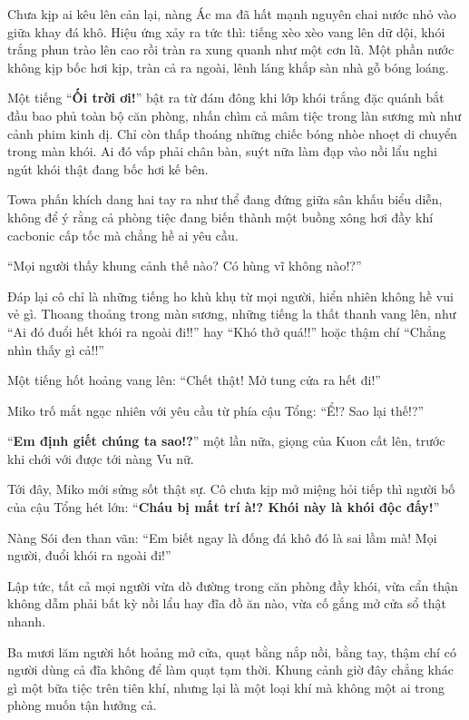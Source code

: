 \documentclass[../main.tex]{subfiles}
\begin{document}
Chưa kịp ai kêu lên cản lại, nàng Ác ma đã hất mạnh nguyên chai nước nhỏ vào giữa khay đá khô. Hiệu ứng xảy ra tức thì: tiếng xèo xèo vang lên dữ dội, khói trắng phun trào lên cao rồi tràn ra xung quanh như một cơn lũ. Một phần nước không kịp bốc hơi kịp, tràn cả ra ngoài, lênh láng khắp sàn nhà gỗ bóng loáng.

Một tiếng ``\textbf{Ối trời ơi!}'' bật ra từ đám đông khi lớp khói trắng đặc quánh bắt đầu bao phủ toàn bộ căn phòng, nhấn chìm cả mâm tiệc trong làn sương mù như cảnh phim kinh dị. Chỉ còn thấp thoáng những chiếc bóng nhòe nhoẹt di chuyển trong màn khói. Ai đó vấp phải chân bàn, suýt nữa làm đạp vào nồi lẩu nghi ngút khói thật đang bốc hơi kế bên.

Towa phấn khích dang hai tay ra như thể đang đứng giữa sân khấu biểu diễn, không để ý rằng cả phòng tiệc đang biến thành một buồng xông hơi đầy khí cacbonic cấp tốc mà chẳng hề ai yêu cầu.

``Mọi người thấy khung cảnh thế nào? Có hùng vĩ không nào!?''

Đáp lại cô chỉ là những tiếng ho khù khụ từ mọi người, hiển nhiên không hề vui vẻ gì. Thoang thoảng trong màn sương, những tiếng la thất thanh vang lên, như ``Ai đó đuổi hết khói ra ngoài đi!!'' hay ``Khó thở quá!!'' hoặc thậm chí ``Chẳng nhìn thấy gì cả!!''

Một tiếng hốt hoảng vang lên: ``Chết thật! Mở tung cửa ra hết đi!''

Miko trố mắt ngạc nhiên với yêu cầu từ phía cậu Tổng: ``Ể!? Sao lại thế!?''

``\textbf{Em định giết chúng ta sao!?}'' một lần nữa, giọng của Kuon cất lên, trước khi chới với được tới nàng Vu nữ.

Tới đây, Miko mới sửng sốt thật sự. Cô chưa kịp mở miệng hỏi tiếp thì người bố của cậu Tổng hét lớn: ``\textbf{Cháu bị mất trí à!? Khói này là khói độc đấy!}''

Nàng Sói đen than vãn: ``Em biết ngay là đống đá khô đó là sai lầm mà! Mọi người, đuổi khói ra ngoài đi!''

Lập tức, tất cả mọi người vừa dò đường trong căn phòng đầy khói, vừa cẩn thận không dẫm phải bất kỳ nồi lẩu hay đĩa đồ ăn nào, vừa cố gắng mở cửa sổ thật nhanh.

Ba mươi lăm người hốt hoảng mở cửa, quạt bằng nắp nồi, bằng tay, thậm chí có người dùng cả đĩa không để làm quạt tạm thời. Khung cảnh giờ đây chẳng khác gì một bữa tiệc trên tiên khí, nhưng lại là một loại khí mà không một ai trong phòng muốn tận hưởng cả.
\end{document}
